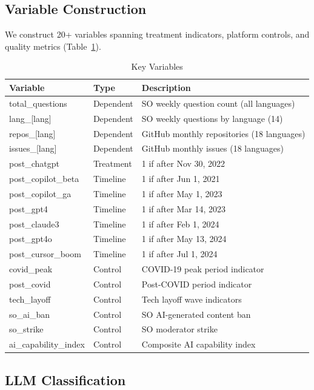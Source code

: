 \documentclass[11pt,a4paper]{article}
\begin{document}
\subsection{Variable Construction}

We construct 20+ variables spanning treatment indicators, platform controls, and quality metrics (Table~\ref{tab:variables}).

\begin{table}[h]
\centering
\caption{Key Variables}
\label{tab:variables}
\begin{tabular}{llp{6cm}}
\toprule
\textbf{Variable} & \textbf{Type} & \textbf{Description} \\
\midrule
total\_questions & Dependent & SO weekly question count (all languages) \\
lang\_[lang] & Dependent & SO weekly questions by language (14) \\
repos\_[lang] & Dependent & GitHub monthly repositories (18 languages) \\
issues\_[lang] & Dependent & GitHub monthly issues (18 languages) \\
\midrule
post\_chatgpt & Treatment & 1 if after Nov 30, 2022 \\
post\_copilot\_beta & Timeline & 1 if after Jun 1, 2021 \\
post\_copilot\_ga & Timeline & 1 if after May 1, 2023 \\
post\_gpt4 & Timeline & 1 if after Mar 14, 2023 \\
post\_claude3 & Timeline & 1 if after Feb 1, 2024 \\
post\_gpt4o & Timeline & 1 if after May 13, 2024 \\
post\_cursor\_boom & Timeline & 1 if after Jul 1, 2024 \\
\midrule
covid\_peak & Control & COVID-19 peak period indicator \\
post\_covid & Control & Post-COVID period indicator \\
tech\_layoff & Control & Tech layoff wave indicators \\
so\_ai\_ban & Control & SO AI-generated content ban \\
so\_strike & Control & SO moderator strike \\
ai\_capability\_index & Control & Composite AI capability index \\
\bottomrule
\end{tabular}
\end{table}

\subsection{LLM Classification}
\end{document}
